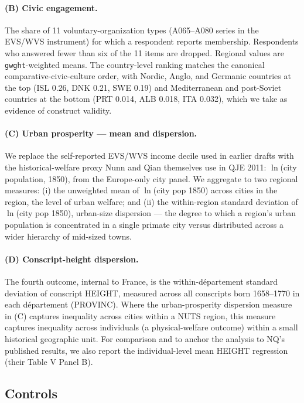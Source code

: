 \paragraph{(B) Civic engagement.} The share of 11 voluntary-organization types (A065--A080 series in the EVS/WVS instrument) for which a respondent reports membership. Respondents who answered fewer than six of the 11 items are dropped. Regional values are \texttt{gwght}-weighted means. The country-level ranking matches the canonical comparative-civic-culture order, with Nordic, Anglo, and Germanic countries at the top (ISL 0.26, DNK 0.21, SWE 0.19) and Mediterranean and post-Soviet countries at the bottom (PRT 0.014, ALB 0.018, ITA 0.032), which we take as evidence of construct validity.

\paragraph{(C) Urban prosperity --- mean and dispersion.} We replace the self-reported EVS/WVS income decile used in earlier drafts with the historical-welfare proxy Nunn and Qian themselves use in QJE 2011: $\ln$(city population, 1850), from the Europe-only city panel. We aggregate to two regional measures: (i) the unweighted mean of $\ln$(city pop 1850) across cities in the region, the level of urban welfare; and (ii) the within-region standard deviation of $\ln$(city pop 1850), urban-size dispersion --- the degree to which a region's urban population is concentrated in a single primate city versus distributed across a wider hierarchy of mid-sized towns.

\paragraph{(D) Conscript-height dispersion.} The fourth outcome, internal to France, is the within-département standard deviation of conscript HEIGHT, measured across all conscripts born 1658--1770 in each département (PROVINC). Where the urban-prosperity dispersion measure in (C) captures inequality across cities within a NUTS region, this measure captures inequality across individuals (a physical-welfare outcome) within a small historical geographic unit. For comparison and to anchor the analysis to NQ's published results, we also report the individual-level mean HEIGHT regression (their Table V Panel B).

\subsection{Controls}

